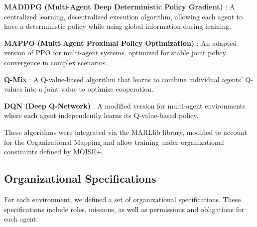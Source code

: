 \documentclass[sigconf,anonymous]{aamas}
\begin{document}
\begin{enumerate*}[label={\roman*)}, itemjoin={; \quad}]
    \item \textbf{MADDPG (Multi-Agent Deep Deterministic Policy Gradient)} \cite{lowe2017multi}: A centralized learning, decentralized execution algorithm, allowing each agent to have a deterministic policy while using global information during training.
    
    \item \textbf{MAPPO (Multi-Agent Proximal Policy Optimization)} \cite{yu2021mappo}: An adapted version of PPO for multi-agent systems, optimized for stable joint policy convergence in complex scenarios.
    
    \item \textbf{Q-Mix} \cite{rashid2018qmix}: A Q-value-based algorithm that learns to combine individual agents' Q-values into a joint value to optimize cooperation.
    
    \item \textbf{DQN (Deep Q-Network)} \cite{mnih2015dqn}: A modified version for multi-agent environments where each agent independently learns its Q-value-based policy.
\end{enumerate*}

These algorithms were integrated via the MARLlib library, modified to account for the Organizational Mapping and allow training under organizational constraints defined by MOISE+.

\subsection{Organizational Specifications}

For each environment, we defined a set of organizational specifications. These specifications include roles, missions, as well as permissions and obligations for each agent:
\end{document}
